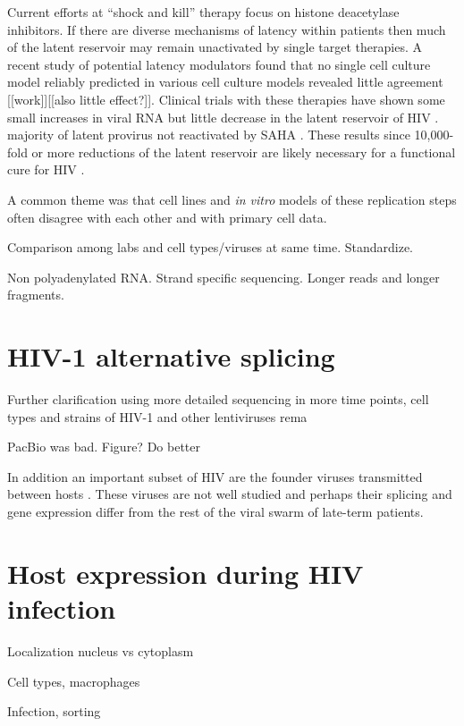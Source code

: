 \documentclass[../sherrill-Mix_thesis.tex]{subfiles}
\begin{document}
	Current efforts at ``shock and kill'' therapy focus on histone deacetylase inhibitors. If there are diverse mechanisms of latency within patients then much of the latent reservoir may remain unactivated by single target therapies.  A recent study of potential latency modulators found that no single cell culture model reliably predicted in various cell culture models revealed little agreement \citep{Spina2013} [[work]][[also little effect?]]. Clinical trials with these therapies have shown some small increases in viral RNA \citep{Archin2012} but little decrease in the latent reservoir of HIV \citep{Archin2014,Spivak2014}. majority of latent provirus not reactivated by SAHA \citep{Cillo2014}. These results since 10,000-fold or more reductions of the latent reservoir are likely necessary for a functional cure for HIV \citep{Hill2014}.



A common theme was that cell lines and \textit{in vitro} models of these replication steps often disagree with each other and with primary cell data. 


Comparison among labs and cell types/viruses at same time. Standardize.

Non polyadenylated RNA. Strand specific sequencing. Longer reads and longer fragments.

\section{HIV-1 alternative splicing}
Further clarification using more detailed sequencing in more time points, cell types and strains of HIV-1 and other lentiviruses rema

PacBio was bad. Figure? Do better

In addition an important subset of HIV are the founder viruses transmitted between hosts \citep{Keele2008,Salazar-Gonzalez2009}. These viruses are not well studied and perhaps their splicing and gene expression differ from the rest of the viral swarm of late-term patients.

\section{Host expression during HIV infection}
Localization nucleus vs cytoplasm

Cell types, macrophages

Infection, sorting
\end{document}
